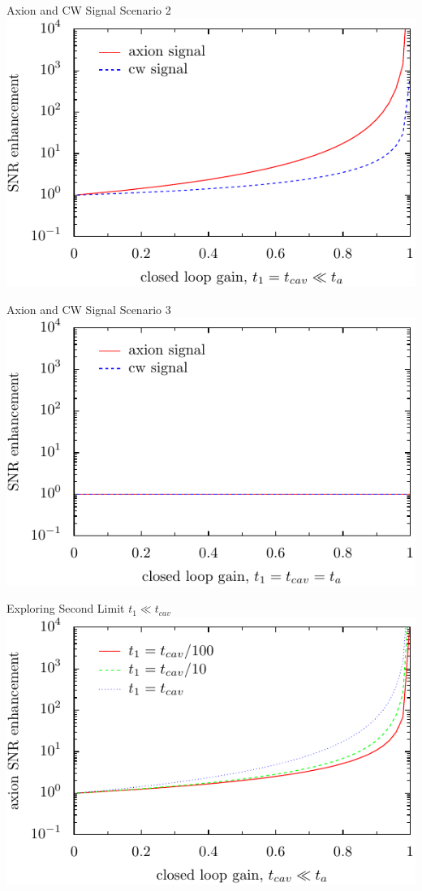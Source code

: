 \documentclass{beamer}
\begin{document}
\begin{frame}{Axion and CW Signal}
{\tiny Scenario 2}
\includegraphics[width=\textwidth]{second_limit}
\end{frame}

\begin{frame}{Axion and CW Signal}
{\tiny Scenario 3}
\includegraphics[width=\textwidth]{third_limit}
\end{frame}

\begin{frame}{Exploring Second Limit}
{\tiny$t_1 \ll t_{cav}$}
\includegraphics[width=\textwidth]{exploring_second_limit_low}
\end{frame}
\end{document}
